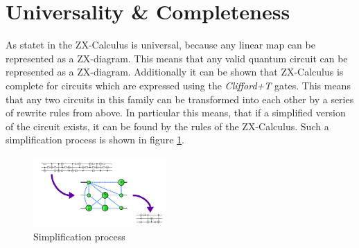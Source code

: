 \section{Universality \& Completeness}

As statet in \cite{duncan2020simplification} the ZX-Calculus is universal, because any linear map can be represented as a ZX-diagram. This means that any valid quantum circuit can be represented as a ZX-diagram. Additionally it can be shown that ZX-Calculus is complete for circuits which are expressed using the \textit{Clifford+T} gates. This means that any two circuits in this family can be transformed into each other by a series of rewrite rules from above.
In particular this means, that if a simplified version of the circuit exists, it can be found by the rules of the ZX-Calculus. Such a simplification process is shown in figure \ref{fig:simplification-idea}.

\begin{figure}[h]
    \centering
    \includegraphics[width=0.45\textwidth]{images/simplification-idea.png}
    \caption{Simplification process\cite{duncan2020simplification-image}}
    \label{fig:simplification-idea}
\end{figure}
